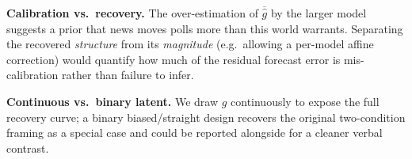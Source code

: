 \textbf{Calibration vs.\ recovery.}  The over-estimation of $\overline{\hat g}$ by the larger
model suggests a prior that news moves polls more than this world warrants.  Separating the
recovered \emph{structure} from its \emph{magnitude} (e.g.\ allowing a per-model affine
correction) would quantify how much of the residual forecast error is mis-calibration rather than
failure to infer.

\textbf{Continuous vs.\ binary latent.}  We draw $g$ continuously to expose the full recovery
curve; a binary biased/straight design recovers the original two-condition framing as a special
case and could be reported alongside for a cleaner verbal contrast.

